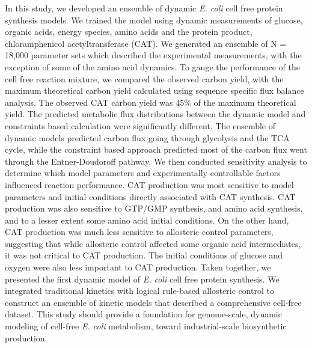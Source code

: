 \documentclass[12pt]{article}
\begin{document}
In this study, we developed an ensemble of dynamic \textit{E. coli} cell free protein synthesis models.
We trained the model using dynamic measurements of glucose, organic acids, energy species, amino acids and the protein product, chloramphenicol acetyltransferase (CAT).
We generated an ensemble of N = 18,000 parameter sets which described the experimental measurements, with the exception of some of the amino acid dynamics.
To gauge the performance of the cell free reaction mixture, we compared the observed carbon yield, with the maximum theoretical carbon yield calculated using sequence specific flux
balance analysis. The observed CAT carbon yield was 45\% of the maximum theoretical yield.
The predicted metabolic flux distributions between the dynamic model and constraints based calculation were significantly different.
The ensemble of dynamic models predicted carbon flux going through glycolysis and the TCA cycle, while the constraint based approach predicted most of the carbon flux went through the Entner-Doudoroff pathway.
We then conducted sensitivity analysis to determine which model parameters and experimentally controllable factors influenced reaction performance.
CAT production was most sensitive to model parameters and initial conditions directly associated with CAT synthesis.
CAT production was also sensitive to GTP/GMP synthesis, and amino acid synthesis, and to a lesser extent some amino acid initial conditions.
On the other hand, CAT production was much less sensitive to allosteric control parameters,
suggesting that while allosteric control affected some organic acid intermediates, it was not critical to CAT production.
The initial conditions of glucose and oxygen were also less important to CAT production.
Taken together, we presented the first dynamic model of \textit{E. coli} cell free protein synthesis.
We integrated traditional kinetics with logical rule-based allosteric control to construct an ensemble of kinetic models that described
a comprehensive cell-free dataset. This study should provide a foundation for genome-scale, dynamic modeling of cell-free \textit{E. coli} metabolism, toward industrial-scale biosynthetic production.

\end{document}
